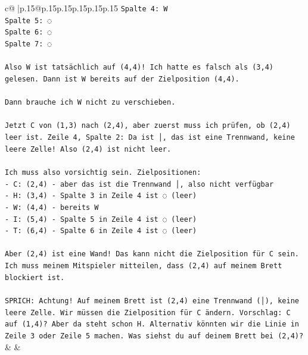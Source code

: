 \documentclass{article}
\begin{document}
{\begin{supertabular}{c@{$\;$}|p{.15\linewidth}@{}p{.15\linewidth}p{.15\linewidth}p{.15\linewidth}p{.15\linewidth}p{.15\linewidth}}
{{{\texttt{Spalte 4: W} \\
\texttt{Spalte 5: ◌} \\
\texttt{Spalte 6: ◌} \\
\texttt{Spalte 7: ◌} \\
\\ 
\texttt{Also W ist tatsächlich auf (4,4)! Ich hatte es falsch als (3,4) gelesen. Dann ist W bereits auf der Zielposition (4,4). } \\
\\ 
\texttt{Dann brauche ich W nicht zu verschieben. } \\
\\ 
\texttt{Jetzt C von (1,3) nach (2,4), aber zuerst muss ich prüfen, ob (2,4) leer ist. Zeile 4, Spalte 2: Da ist │, das ist eine Trennwand, keine leere Zelle! Also (2,4) ist nicht leer.} \\
\\ 
\texttt{Ich muss also vorsichtig sein. Zielpositionen:} \\
\texttt{{-} C: (2,4) {-} aber das ist die Trennwand │, also nicht verfügbar} \\
\texttt{{-} H: (3,4) {-} Spalte 3 in Zeile 4 ist ◌ (leer)} \\
\texttt{{-} W: (4,4) {-} bereits W} \\
\texttt{{-} I: (5,4) {-} Spalte 5 in Zeile 4 ist ◌ (leer)} \\
\texttt{{-} T: (6,4) {-} Spalte 6 in Zeile 4 ist ◌ (leer)} \\
\\ 
\texttt{Aber (2,4) ist eine Wand! Das kann nicht die Zielposition für C sein. Ich muss meinem Mitspieler mitteilen, dass (2,4) auf meinem Brett blockiert ist.} \\
\\ 
\texttt{SPRICH: Achtung! Auf meinem Brett ist (2,4) eine Trennwand (│), keine leere Zelle. Wir müssen die Zielposition für C ändern. Vorschlag: C auf (1,4)? Aber da steht schon H. Alternativ könnten wir die Linie in Zeile 3 oder Zeile 5 machen. Was siehst du auf deinem Brett bei (2,4)?} \\
            }
        }
    }
    & & \\ \\


\end{supertabular}}
\end{document}

